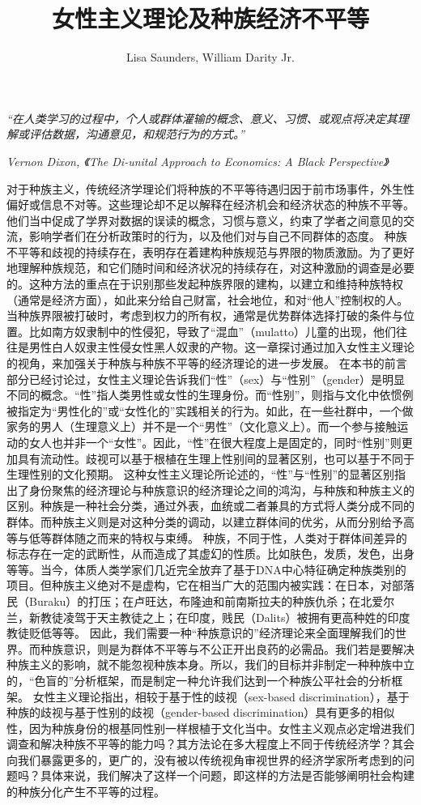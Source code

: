 \documentclass[UTF8]{ctexart}
\title{女性主义理论及种族经济不平等}
\author{Lisa Saunders, William Darity Jr.}
\begin{document}
\maketitle


\textit{“在人类学习的过程中，个人或群体灌输的概念、意义、习惯、或观点将决定其理解或评估数据，沟通意见，和规范行为的方式。”}


\textit{Vernon Dixon, 《The Di-unital Approach to Economics: A Black Perspective》}




对于种族主义，传统经济学理论们将种族的不平等待遇归因于前市场事件，外生性偏好或信息不对等。这些理论却不足以解释在经济机会和经济状态的种族不平等。他们当中促成了学界对数据的误读的概念，习惯与意义，约束了学者之间意见的交流，影响学者们在分析政策时的行为，以及他们对与自己不同群体的态度。
种族不平等和歧视的持续存在，表明存在着建构种族规范与界限的物质激励。为了更好地理解种族规范，和它们随时间和经济状况的持续存在，对这种激励的调查是必要的。这种方法的重点在于识别那些发起种族界限的建构，以建立和维持种族特权（通常是经济方面），如此来分给自己财富，社会地位，和对“他人”控制权的人。当种族界限被打破时，考虑到权力的所有权，通常是优势群体选择打破的条件与位置。比如南方奴隶制中的性侵犯，导致了“混血”（mulatto）儿童的出现，他们往往是男性白人奴隶主性侵女性黑人奴隶的产物。这一章探讨通过加入女性主义理论的视角，来加强关于种族与种族不平等的经济理论的进一步发展\cite{01}。
在本书的前言部分已经讨论过，女性主义理论告诉我们“性”（sex）与“性别”（gender）是明显不同的概念。“性”指人类男性或女性的生理身份。而“性别”，则指与文化中依惯例被指定为“男性化的”或“女性化的”实践相关的行为。如此，在一些社群中，一个做家务的男人（生理意义上）并不是一个“男性”（文化意义上）。而一个参与接触运动的女人也并非一个“女性”。因此，“性”在很大程度上是固定的，同时“性别”则更加具有流动性。歧视可以基于根植在生理上性别间的显著区别，也可以基于不同于生理性别的文化预期。
这种女性主义理论所论述的，“性”与“性别”的显著区别指出了身份聚焦的经济理论与种族意识的经济理论之间的鸿沟，与种族和种族主义的区别。种族是一种社会分类，通过外表，血统或二者兼具的方式将人类分成不同的群体。而种族主义则是对这种分类的调动，以建立群体间的优劣，从而分别给予高等与低等群体随之而来的特权与束缚。
种族，不同于性，人类对于群体间差异的标志存在一定的武断性，从而造成了其虚幻的性质。比如肤色，发质，发色，出身等等。当今，体质人类学家们几近完全放弃了基于DNA中心特征确定种族类别的项目。但种族主义绝对不是虚构，它在相当广大的范围内被实践：在日本，对部落民（Buraku）的打压；在卢旺达，布隆迪和前南斯拉夫的种族仇杀；在北爱尔兰，新教徒凌驾于天主教徒之上；在印度，贱民（Dalits）被拥有更高种姓的印度教徒贬低等等。
因此，我们需要一种“种族意识的”经济理论来全面理解我们的世界。而种族意识，则是为群体不平等与不公正开出良药的必需品。我们若是要解决种族主义的影响，就不能忽视种族本身。所以，我们的目标并非制定一种种族中立的，“色盲的”分析框架，而是制定一种允许我们达到一个种族公平社会的分析框架。
女性主义理论指出，相较于基于性的歧视（sex-based discrimination），基于种族的歧视与基于性别的歧视（gender-based discrimination）具有更多的相似性，因为种族身份的根基同性别一样根植于文化当中。女性主义观点必定增进我们调查和解决种族不平等的能力吗？其方法论在多大程度上不同于传统经济学？其会向我们暴露更多的，更广的，没有被以传统视角审视世界的经济学家所考虑到的问题吗？具体来说，我们解决了这样一个问题，即这样的方法是否能够阐明社会构建的种族分化产生不平等的过程。
\end{document}
